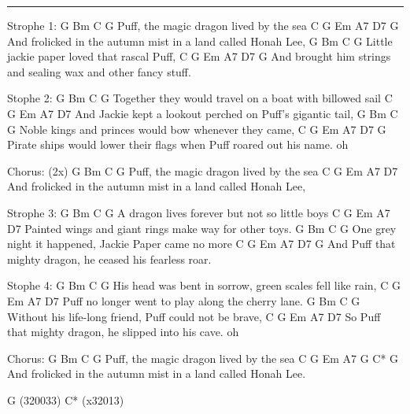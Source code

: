 \noindent\rule{\columnwidth}{1pt}

\begin{lstsong}
Strophe 1:
G               Bm     C            G
Puff, the magic dragon lived by the sea
    C                G      Em        A7           D7   G
And frolicked in the autumn mist in a land called Honah Lee,
G             Bm    C                 G
Little jackie paper loved that rascal Puff,
    C                       G       Em      A7    D7    G
And brought him strings and sealing wax and other fancy stuff.

Stophe 2:
G                   Bm          C                  G
Together they would travel on a boat with billowed sail
    C             G       Em         A7              D7
And Jackie kept a lookout perched on Puff's gigantic tail,
G               Bm            C                 G
Noble kings and princes would bow whenever they came,
C                  G           Em         A7          D7      G
Pirate ships would lower their flags when Puff roared out his name. oh

Chorus: (2x)
G               Bm     C            G
Puff, the magic dragon lived by the sea
    C                G      Em        A7               D7
And frolicked in the autumn mist in a land called Honah Lee,

Strophe 3:
  G            Bm          C             G
A dragon lives forever but not so little boys
C                 G     Em         A7            D7
Painted wings and giant rings make way for other toys.
G                 Bm               C             G
One grey night it happened, Jackie Paper came no more
    C                G       Em   A7           D7   G
And Puff that mighty dragon, he ceased his fearless roar.

Stophe 4:
    G                Bm            C                G
His head was bent in sorrow, green scales fell like rain,
C              G       Em   A7               D7
Puff no longer went to play along the cherry lane.
    G                 Bm      C                 G
Without his life-long friend, Puff could not be brave,
   C                G       Em A7               D7
So Puff that mighty dragon, he slipped into his cave. oh

Chorus:
G               Bm     C            G
Puff, the magic dragon lived by the sea
    C                G      Em        A7          G  C* G
And frolicked in the autumn mist in a land called Honah Lee.

G  (320033)
C* (x32013)
\end{lstsong}
\newpage

